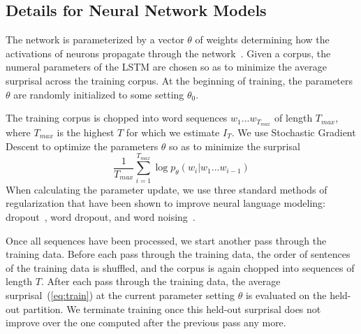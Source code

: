 \documentclass[11pt,letterpaper]{article}
\begin{document}
%
%
%
%
%

\subsection{Details for Neural Network Models}

The network is parameterized by a vector $\theta$ of weights determining how the activations of neurons propagate through the network~\citep{hochreiter-long-1997}.
Given a corpus, the numeral parameters of the LSTM are chosen so as to minimize the average surprisal across the training corpus.
At the beginning of training, the parameters $\theta$ are randomly initialized to some setting $\theta_0$.

The training corpus is chopped into word sequences $w_1 ... w_{T_{max}}$ of length ${T_{max}}$, where ${T_{max}}$ is the highest $T$ for which we estimate $I_T$. %
We use Stochastic Gradient Descent to optimize the parameters $\theta$ so as to minimize the surprisal
\begin{equation}\label{eq:train}
	\frac{1}{T_{max}} \sum_{i=1}^{T_{max}} \log p_\theta(w_i|w_1...w_{i-1})
\end{equation}
When calculating the parameter update, we use three standard methods of regularization that have been shown to improve neural language modeling: dropout~\citep{srivastava-dropout:-2014}, word dropout, and word noising~\citep{xie2017data}.

Once all sequences have been processed, we start another pass through the training data.
Before each pass through the training data, the order of sentences of the training data is shuffled, and the corpus is again chopped into sequences of length $T$.
After each pass through the training data, the average surprisal~(\ref{eq:train}) at the current parameter setting $\theta$ is evaluated on the held-out partition.
We terminate training once this held-out  surprisal does not improve over the one computed after the previous pass any more.
\end{document}
